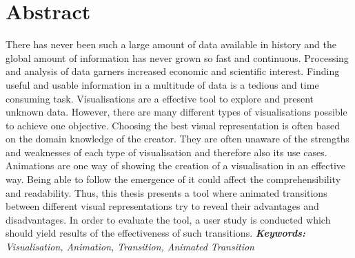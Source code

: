 \section*{Abstract}
\vspace{0.5cm}

There has never been such a large amount of data available in history and the global amount of information has never grown so fast and continuous. Processing and analysis of data garners increased economic and scientific interest. Finding useful and usable information in a multitude of data is a tedious and time consuming task. Visualisations are a effective tool to explore and present unknown data. However, there are many different types of visualisations possible to achieve one objective. Choosing the best visual representation is often based on the domain knowledge of the creator. They are often unaware of the strengths and weaknesses of each type of visualisation and therefore also its use cases.
\cbstart
Animations are one way of showing the creation of a visualisation in an effective way. Being able to follow the emergence of it could affect the comprehensibility and readability. Thus, this thesis presents a tool where animated transitions between different visual representations try to reveal their advantages and disadvantages. In order to evaluate the tool, a user study is conducted which should yield results of the effectiveness of such transitions.
\cbend
\vspace{0.5cm}
\textbf{\textit{Keywords:}} \\
\textit{Visualisation, Animation, Transition, Animated Transition}